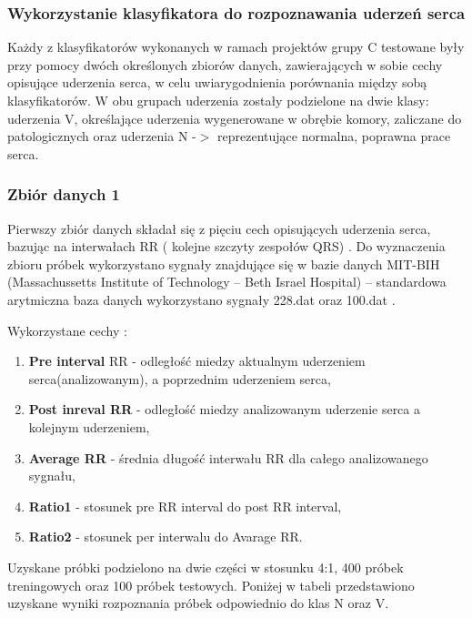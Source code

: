 \documentclass[[10pt,a4paper]{article}
\begin{document}
\begin{enumerate}
\begin{itemize}
\noindent 

\noindent 

\subsubsection{Wykorzystanie klasyfikatora do rozpoznawania uderzeń serca}

\noindent Każdy z klasyfikatorów wykonanych w ramach projektów grupy C testowane były przy pomocy dwóch określonych zbiorów danych, zawierających w sobie cechy opisujące uderzenia serca, w celu uwiarygodnienia porównania między sobą klasyfikatorów. W obu grupach uderzenia zostały podzielone na dwie klasy: uderzenia V, określające uderzenia wygenerowane w obrębie komory, zaliczane do patologicznych oraz uderzenia N -$>$ reprezentujące normalna, poprawna prace serca.

\subsubsection{ Zbiór danych 1}

\noindent Pierwszy zbiór danych składał się z pięciu cech opisujących uderzenia serca, bazując na interwałach RR ( kolejne szczyty zespołów QRS) . Do wyznaczenia zbioru próbek wykorzystano sygnały znajdujące się w bazie danych MIT-BIH (Massachussetts Institute of Technology -- Beth Israel Hospital) -- standardowa arytmiczna baza danych wykorzystano sygnały 228.dat oraz 100.dat .

\noindent Wykorzystane cechy : 

\begin{enumerate}
\item  \textbf{Pre interval} RR - odległość miedzy aktualnym uderzeniem serca(analizowanym), a poprzednim uderzeniem serca,

\item  \textbf{Post inreval RR} - odległość miedzy analizowanym uderzenie serca a kolejnym uderzeniem,

\item  \textbf{Average RR} - średnia długość interwału RR dla całego analizowanego sygnału,

\item  \textbf{Ratio1} - stosunek pre RR interval do post RR interval,

\item  \textbf{Ratio2 }- stosunek per interwalu do Avarage RR.
\end{enumerate}

\noindent Uzyskane próbki podzielono na dwie części w stosunku 4:1, 400 próbek treningowych oraz 100 próbek testowych. Poniżej w tabeli przedstawiono uzyskane wyniki rozpoznania próbek odpowiednio do klas N oraz V.


\end{itemize}
\end{enumerate}
\end{document}
